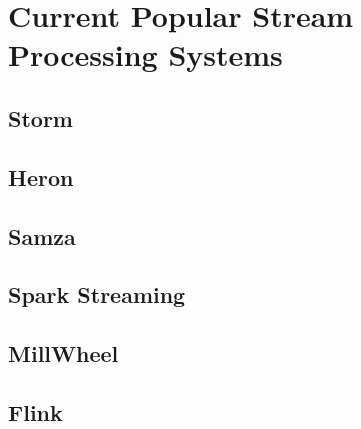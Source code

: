 \section{Current Popular Stream Processing Systems}

\subsection{Storm}
\subsection{Heron}
\subsection{Samza}
\subsection{Spark Streaming}
\subsection{MillWheel}
\subsection{Flink}

